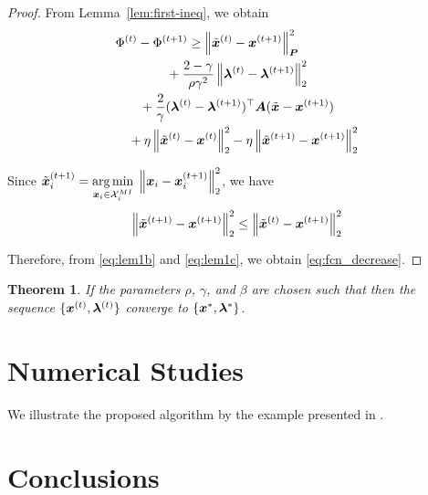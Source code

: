 \documentclass[twocolumn,amsthm]{autart}%
\theoremstyle{definition}
\theoremstyle{plain}
\newtheorem{theorem}{Theorem}
\begin{document}
\begin{proof}
From Lemma~\ref{lem:first-ineq}, we obtain
\begin{equation}
\label{eq:lem1b}
\begin{multlined}
\Phi^{(t)} - \Phi^{(t+1)} 
\ge \norm{\xtil^{(t)}-\bbsym{x}^{(t+1)}}_{\bbsym{P}}^2  \\
+ \frac{2-\gamma}{\rho \gamma^2} \norm{\bbsym{\lambda}^{(t)}-\bbsym{\lambda}^{(t+1)}}_2^2 \\
+ \frac{2}{\gamma} (\bbsym{\lambda}^{(t)}-\bbsym{\lambda}^{(t+1)})^\top \bbsym{A} (\xtil-\bbsym{x}^{(t+1)}) \\
+ \eta \norm{\xtil^{(t)}-\bbsym{x}^{(t)}}_2^2 - \eta \norm{\xtil^{(t+1)}-\bbsym{x}^{(t+1)}}_2^2 
\end{multlined}
\end{equation}

Since $\Tilde{\boldsymbol{x}}_i^{(t+1)} = \underset{\boldsymbol{x}_i \in \mathcal{X}_i^{\relax{MI}}}{\operatorname*{arg\,min}} \;\left\lVert \boldsymbol{x}_i - \boldsymbol{x}_i^{(t+1)} \right\rVert_2^2$, we have
\begin{equation}
\label{eq:lem1c}
\left\lVert \Tilde{\boldsymbol{x}}^{(t+1)} - \boldsymbol{x}^{(t+1)} \right\rVert_2^2 
\le \left\lVert \Tilde{\boldsymbol{x}}^{(t)} - \boldsymbol{x}^{(t+1)} \right\rVert_2^2 
\end{equation}

Therefore, from \eqref{eq:lem1b} and \eqref{eq:lem1c}, we obtain \eqref{eq:fcn_decrease}.
\end{proof}

\begin{theorem}
If the parameters $\rho$, $\gamma$, and $\beta$ are chosen such that 
then the sequence $\{\boldsymbol{x}^{(t)} , \boldsymbol{\lambda}^{(t)}\}$ converge to $\{\boldsymbol{x}^{*} , \boldsymbol{\lambda}^{*} \}$.
\end{theorem}

\section{Numerical Studies}

We illustrate the proposed algorithm by the example presented in \cite{le2024distributed}.

\section{Conclusions}
\end{document}
